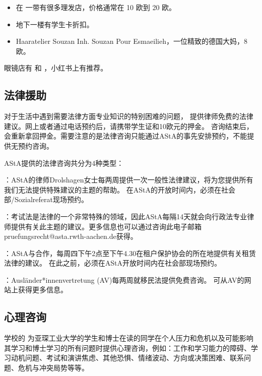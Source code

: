     \begin{itemize}
      \item 在  一带有很多理发店，价格通常在 10 欧到 20 欧。
      \item {} 地下一楼有学生卡折扣。
      \item Haaratelier Souzan Inh. Souzan Pour Esmaeilieh，一位精致的德国大妈，8 欧。
    \end{itemize}

    眼镜店有  和 ，小红书上有推荐。

  \subsection{法律援助}\label{subsec:法律援助}

    对于生活中遇到需要法律方面专业知识的特别困难的问题，\href{https://www.asta.rwth-aachen.de/beratung/rechtsberatung/}{} 提供律师免费的法律建议。网上或者通过电话预约后，请携带学生证和10欧元的押金。 咨询结束后，会重新拿回押金。需要注意的是法律咨询只能通过AStA的事先安排预约，不能提供无预约咨询。

    AStA提供的法律咨询共分为4种类型：

    ：AStA的律师Drolshagen女士每两周提供一次一般性法律建议，将为您提供所有我们无法提供特殊建议的主题的帮助。 在AStA的开放时间内，必须在社会部/Sozialreferat现场预约。

    ：考试法是法律的一个非常特殊的领域，因此AStA每隔14天就会向行政法专业律师提供有关此主题的建议。更多信息也可以通过咨询此电子邮箱pruefungsrecht@asta.rwth-aachen.de获得。

    ：AStA与\href{https://mieterverein-aachen.de/}{}合作，每周四下午2点至下午4.30在租户保护协会的所在地提供有关租赁法律的建议。 在此之前，必须在AStA开放时间内在社会部现场预约。

    ：Ausländer*innenvertretung (AV)每两周就移民法提供免费咨询。 可从AV的网站上获得更多信息。

  \subsection{心理咨询}\label{subsec:心理咨询}

    学校的\href{https://www.rwth-aachen.de/cms/root/Studium/Beratung-Hilfe/~sei/Psychologische-Beratung/}{} 为亚琛工业大学的学生和博士在读的同学在个人压力和危机以及可能影响其学习和博士学习的所有问题时提供心理咨询，例如：工作和学习能力的障碍、学习动机问题、考试和演讲焦虑、其他恐惧、情绪波动、方向或决策困难、联系问题、危机与冲突局势等等。

